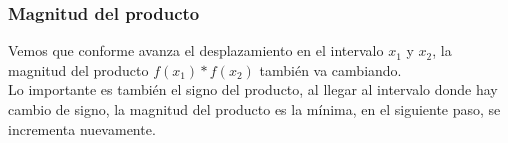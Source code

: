 \begin{frame}
\frametitle{Magnitud del producto}
Vemos que conforme avanza el desplazamiento en el intervalo $x_{1}$ y $x_{2}$, la magnitud del producto $f(x_{1}) * f(x_{2})$ también va cambiando.
\\
\bigskip
Lo importante es también el signo del producto, al llegar al intervalo donde hay cambio de signo, la magnitud del producto es la mínima, en el siguiente paso, se incrementa nuevamente.
\end{frame}


